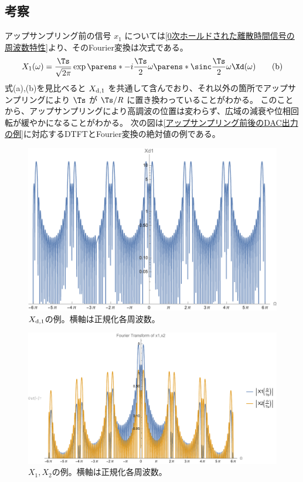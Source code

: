         \subsection{考察}
            アップサンプリング前の信号 $x_1$ については\ref{0次ホールドされた離散時間信号の周波数特性}より、そのFourier変換は次式である。
            \[ X_1(\omega) = \frac{\Ts}{\sqrt{2\pi}}\exp\parens*{-i\frac{\Ts}{2}\omega}\parens*{\sinc \frac{\Ts}{2}\omega}\Xd(\omega) \tag{b} \]
            式(a),(b)を見比べると $X_{\text{d},1}$ を共通して含んでおり、それ以外の箇所でアップサンプリングにより $\Ts$ が $\Ts/R$ に置き換わっていることがわかる。
            このことから、アップサンプリングにより高調波の位置は変わらず、広域の減衰や位相回転が緩やかになることがわかる。
            次の図は\ref{アップサンプリング前後のDAC出力の例}に対応するDTFTとFourier変換の絶対値の例である。
            \begin{figure}[H]
                \centering
                \includegraphics[keepaspectratio, scale=0.8]
                {parts/time-discretization/chapters/up-sampling/imgs/Xd1.pdf}
                \caption{$X_{\text{d},1}$の例。横軸は正規化各周波数。}
            \end{figure}
            \begin{figure}[H]
                \centering
                \includegraphics[keepaspectratio, scale=0.8]
                {parts/time-discretization/chapters/up-sampling/imgs/FT_of_x1,x2.pdf}
                \caption{$X_1,X_2$の例。横軸は正規化各周波数。}
            \end{figure}